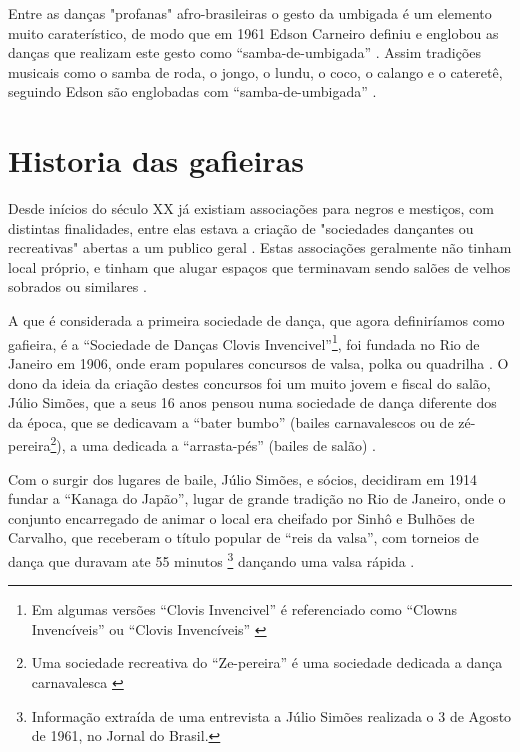 Entre as danças "profanas" \cite[pp. 85]{sandroni2001feitico} afro-brasileiras o gesto da umbigada é um elemento muito caraterístico,
de modo que em 1961 Edson Carneiro definiu e englobou as danças que realizam este 
gesto como ``samba-de-umbigada'' . Assim tradições 
musicais como o samba de roda, o jongo, o lundu, o coco, o calango e o cateretê, 
seguindo Edson são englobadas com  ``samba-de-umbigada'' \cite[pp. 85]{sandroni2001feitico}.

\section{Historia das gafieiras}

Desde inícios do século XX já existiam associações para negros e mestiços, 
com distintas  finalidades, entre elas estava a criação de 
"sociedades dançantes ou recreativas" abertas a um publico geral
\cite[pp. 154-155]{neres1999negro} \cite[pp. 71]{de2008bexiga} \cite[pp. 11]{respeitojournalbrasil1}.
Estas associações geralmente não tinham local próprio, 
e tinham que alugar espaços que terminavam sendo salões de velhos sobrados
ou similares \cite[pp. 154-155]{neres1999negro} \cite[pp. 49]{diniz2003almanaque}.

A que é considerada a primeira sociedade de dança, que agora definiríamos como gafieira, 
é a ``Sociedade de Danças Clovis Invencivel''\footnote{Em algumas versões 
``Clovis Invencivel'' é referenciado como ``Clowns Invencíveis'' \cite[pp. 3]{juliosimoes} ou 
``Clovis Invencíveis'' \cite[pp. 10]{simoesjournalbrasil1}}, 
foi fundada no Rio de Janeiro em 1906, 
onde eram populares concursos de valsa, polka ou quadrilha \cite[pp. 3]{entrevistajuliojournalbrasil1}.
O dono da ideia da criação destes concursos foi um muito jovem e fiscal do salão, Júlio Simões,
que a seus 16 anos pensou numa sociedade de dança diferente dos da época,
que se dedicavam a ``bater bumbo'' (bailes carnavalescos ou de zé-pereira\footnote{ Uma sociedade recreativa do ``Ze-pereira''
é uma sociedade dedicada a dança carnavalesca \cite[pp. 10]{simoesjournalbrasil1}}), 
a uma dedicada a ``arrasta-pés'' (bailes de salão) \cite[pp. 3]{entrevistajuliojournalbrasil1} \cite[pp. 3]{juliosimoes} \cite[pp. 10]{simoesjournalbrasil1}.

Com o surgir dos lugares de baile, 
Júlio Simões, e sócios, decidiram em 1914 fundar a ``Kanaga do Japão'',
lugar de grande tradição no Rio de Janeiro,
onde o conjunto encarregado de animar o local era cheifado por Sinhô e Bulhões de Carvalho,
que receberam o título popular de ``reis da valsa'',
com torneios de dança que duravam ate 55 
minutos \footnote{Informação extraída de uma entrevista a Júlio Simões realizada o 3 de Agosto de 1961, no Jornal do Brasil.} 
dançando uma valsa rápida \cite[pp. 3]{entrevistajuliojournalbrasil1}.

